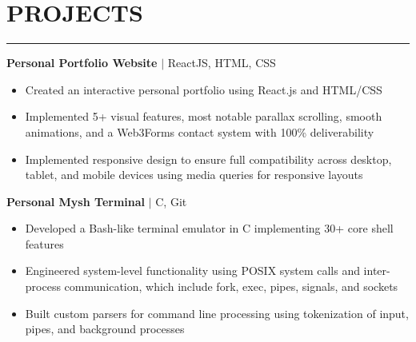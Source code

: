 \documentclass[letterpaper,10.5pt]{article}
\begin{document}
\section*{\textnormal{PROJECTS}}\vspace{-19pt}
\noindent\rule{\textwidth}{0.2 pt}
\noindent\textbf{Personal Portfolio Website} $|$ ReactJS, HTML, CSS
\begin{itemize}
\setlength\itemsep{1pt}
\item Created an interactive personal portfolio using React.js and HTML/CSS
\item Implemented 5+ visual features, most notable parallax scrolling, smooth animations, and a Web3Forms contact system with 100\% deliverability
\item Implemented responsive design to ensure full compatibility across desktop, tablet, and mobile devices using media queries for responsive layouts
\end{itemize}
\vspace{5pt}
\noindent\textbf{Personal Mysh Terminal} $|$ C, Git
\begin{itemize}
\setlength\itemsep{1pt}
\item Developed a Bash-like terminal emulator in C implementing 30+ core shell features
\item Engineered system-level functionality using POSIX system calls and inter-process communication, which include fork, exec, pipes, signals, and sockets
\item Built custom parsers for command line processing using tokenization of input, pipes, and background processes
\end{itemize}
\end{document}
